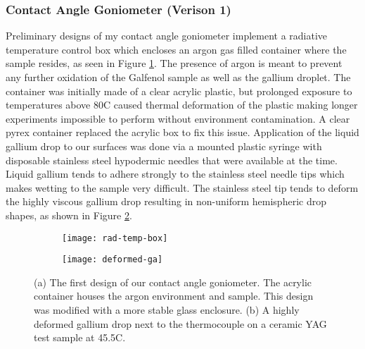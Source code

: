 
\subsubsection{Contact Angle Goniometer (Verison 1)}
Preliminary designs of my contact angle goniometer implement a radiative temperature control box which encloses an argon gas filled container where the sample resides, as seen in Figure \ref{fig:rad-temp-box}.  The presence of argon is meant to prevent any further oxidation of the Galfenol sample as well as the gallium droplet. The container was initially made of a clear acrylic plastic, but prolonged exposure to temperatures above 80\degree C caused thermal deformation of the plastic making longer experiments impossible to perform without environment contamination.  A clear pyrex container replaced the acrylic box to fix this issue.  Application of the liquid gallium drop to our surfaces was done via a mounted plastic syringe with disposable stainless steel hypodermic needles that were available at the time. Liquid gallium tends to adhere strongly to the stainless steel needle tips which makes wetting to the sample very difficult. The stainless steel tip tends to deform the highly viscous gallium drop resulting in non-uniform hemispheric drop shapes, as shown in Figure \ref{fig:deformed-ga}.
\begin{figure}
	\centering
	\begin{subfigure}[c]{0.45\textwidth}
		\texttt{[image: rad-temp-box]}
		\subcaption{~}
		\label{fig:rad-temp-box}		
	\end{subfigure}
	\begin{subfigure}[c]{0.45\textwidth} 
		\texttt{[image: deformed-ga]}
		\subcaption{~}
		\label{fig:deformed-ga}		
	\end{subfigure}
	\caption{(a) The first design of our contact angle goniometer.  The acrylic container houses the argon environment and sample.  This design was modified with a more stable glass enclosure. (b) A highly deformed gallium drop next to the thermocouple on a ceramic YAG test sample at 45.5\degree C.}
	\label{fig:prelim-design}
\end{figure}

